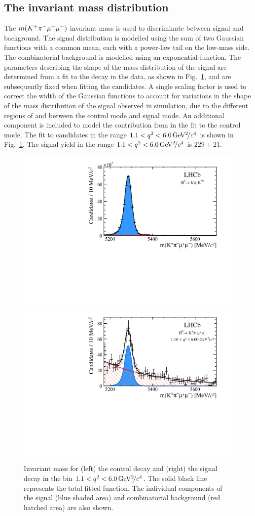 \subsection{The \kpimm invariant mass distribution}
\label{sec:kpimm:massfit}

The $m({{K}^+}{{\pi}^-}{\mu^+\mu^-})$ invariant mass is used to discriminate between signal and background. The signal distribution is modelled using the sum of two Gaussian functions with a common mean, each with a power-law tail on the low-mass side.  The combinatorial background is modelled using an exponential function.  The parameters describing the shape of the mass distribution of the signal are determined from a fit to the \BdToJPsiKstP decay in the data, as shown in Fig.~\ref{fig:massfit}, and are subsequently fixed when fitting the \BdToKpimm candidates. A single scaling factor is used to correct the width of the Gaussian functions to account for variations in the shape of the mass distribution of the signal observed in simulation, due to the different regions of \mkpi and \qsq between the control mode and signal mode.  An additional component is included to model the contribution from \BsToJPsiKst in the fit to the control mode. %
The fit to \BdToKpimm candidates in the range $1.1 < {q^2} < 6.0{\mathrm{\,Ge\kern -0.1em V^2\!/}c^4}$ is shown in Fig.~\ref{fig:massfit}. The signal yield in the range $1.1 < {q^2} < 6.0{\mathrm{\,Ge\kern -0.1em V^2\!/}c^4}$ is $229 \pm 21$.
 
\begin{figure}[!tb]
\centering
\includegraphics[width=0.48\linewidth]{figs/kpimm/massfit/fit_jpsi.pdf}
\includegraphics[width=0.48\linewidth]{figs/kpimm/massfit/fitKpimumu_q2_1p1_6p0.pdf}
\caption{Invariant mass \mkpimm for (left) the control decay \BdToJPsiKst and (right) the signal decay \BdToKpimm in the bin $1.1 < {q^2} < 6.0{\mathrm{\,Ge\kern -0.1em V^2\!/}c^4}$. The solid black line represents the total fitted function.  The individual components of the signal (blue shaded area) and combinatorial background (red hatched area) are also shown.}
\label{fig:massfit}
\end{figure}